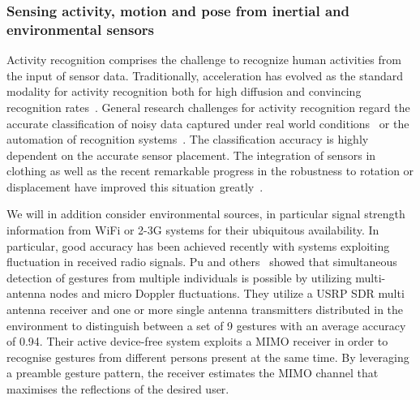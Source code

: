 \documentclass[12pt]{article}
\begin{document}
\subsubsection*{Sensing activity, motion and pose from inertial and environmental sensors}
Activity recognition comprises the challenge to recognize human activities from the input of sensor data.
Traditionally, acceleration has evolved as the standard modality for activity recognition both for high diffusion and convincing recognition rates~\cite{Pervasive_Ravi_2005,Pervasive_Cao_2012}.
General research challenges for activity recognition regard the accurate classification of noisy data captured under real world conditions~\cite{Pervasive_Bao_2004} or the automation of recognition systems~\cite{Pervasive_Ploetz_2012}.
The classification accuracy is highly dependent on the accurate sensor placement.
The integration of sensors in clothing as well as the recent remarkable progress in the robustness to rotation or displacement have improved this situation greatly~\cite{Pevasive_Chavarriaga_2011}.

We will in addition consider environmental sources, in particular signal strength information from WiFi or 2-3G systems for their ubiquitous availability. 
In particular, good accuracy has been achieved recently with systems exploiting fluctuation in received radio signals. 
Pu and others~\cite{RFsensing_Pu_2013,RFsensing_Kim_2009} showed that simultaneous detection of gestures from multiple individuals is possible by utilizing multi-antenna nodes and micro Doppler fluctuations.
They utilize a USRP SDR multi antenna receiver and one or more single antenna transmitters distributed in the environment to distinguish between a set of 9 gestures with an average accuracy of 0.94. 
Their active device-free system exploits a MIMO receiver in order to recognise gestures from different persons present at the same time. 
By leveraging a preamble gesture pattern, the receiver estimates the MIMO channel that maximises the reflections of the desired user.
\end{document}
